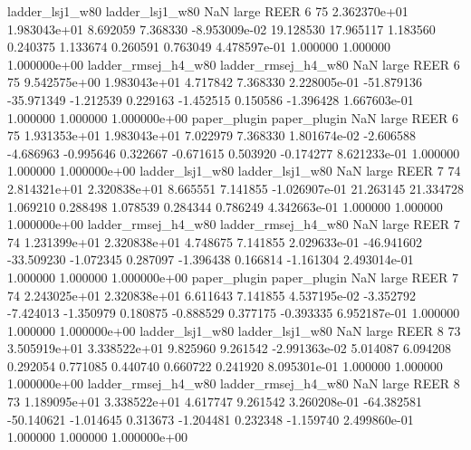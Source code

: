     ladder_lsj1_w80     ladder_lsj1_w80                   NaN      large     REER                 6 75 2.362370e+01   1.983043e+01      8.692059       7.368330 -8.953009e-02     19.128530     17.965117     1.183560       0.240375  1.133674   0.260591     0.763049   4.478597e-01            1.000000        1.000000        1.000000e+00
ladder_rmsej_h4_w80 ladder_rmsej_h4_w80                   NaN      large     REER                 6 75 9.542575e+00   1.983043e+01      4.717842       7.368330  2.228005e-01    -51.879136    -35.971349    -1.212539       0.229163 -1.452515   0.150586    -1.396428   1.667603e-01            1.000000        1.000000        1.000000e+00
       paper_plugin        paper_plugin                   NaN      large     REER                 6 75 1.931353e+01   1.983043e+01      7.022979       7.368330  1.801674e-02     -2.606588     -4.686963    -0.995646       0.322667 -0.671615   0.503920    -0.174277   8.621233e-01            1.000000        1.000000        1.000000e+00
    ladder_lsj1_w80     ladder_lsj1_w80                   NaN      large     REER                 7 74 2.814321e+01   2.320838e+01      8.665551       7.141855 -1.026907e-01     21.263145     21.334728     1.069210       0.288498  1.078539   0.284344     0.786249   4.342663e-01            1.000000        1.000000        1.000000e+00
ladder_rmsej_h4_w80 ladder_rmsej_h4_w80                   NaN      large     REER                 7 74 1.231399e+01   2.320838e+01      4.748675       7.141855  2.029633e-01    -46.941602    -33.509230    -1.072345       0.287097 -1.396438   0.166814    -1.161304   2.493014e-01            1.000000        1.000000        1.000000e+00
       paper_plugin        paper_plugin                   NaN      large     REER                 7 74 2.243025e+01   2.320838e+01      6.611643       7.141855  4.537195e-02     -3.352792     -7.424013    -1.350979       0.180875 -0.888529   0.377175    -0.393335   6.952187e-01            1.000000        1.000000        1.000000e+00
    ladder_lsj1_w80     ladder_lsj1_w80                   NaN      large     REER                 8 73 3.505919e+01   3.338522e+01      9.825960       9.261542 -2.991363e-02      5.014087      6.094208     0.292054       0.771085  0.440740   0.660722     0.241920   8.095301e-01            1.000000        1.000000        1.000000e+00
ladder_rmsej_h4_w80 ladder_rmsej_h4_w80                   NaN      large     REER                 8 73 1.189095e+01   3.338522e+01      4.617747       9.261542  3.260208e-01    -64.382581    -50.140621    -1.014645       0.313673 -1.204481   0.232348    -1.159740   2.499860e-01            1.000000        1.000000        1.000000e+00
